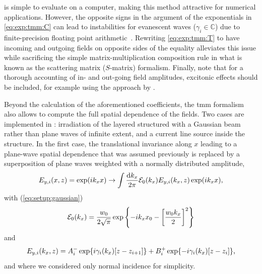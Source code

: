  is simple to evaluate on a computer, making this method attractive for numerical applications.
However, the opposite signs in the argument of the exponentials in \cref{eq:exp:tmm:C} can lead to instabilities for evanescent waves ($\gamma_i\in\mathbb{C}$) due to finite-precision floating point arithmetic~\cite{Duetz}.
Rewriting \cref{eq:exp:tmm:T} to have incoming and outgoing fields on opposite sides of the equality alleviates this issue while sacrificing the simple matrix-multiplication composition rule in what is known as the scattering matrix ($S$-matrix) formalism.
Finally, note that for a thorough accounting of in- and out-going field amplitudes, excitonic effects should be included, for example using the approach by \citet{DAndrea1990}.

Beyond the calculation of the aforementioned coefficients, the \gls{tmm} formalism also allows to compute the full spatial dependence of the fields.
Two cases are implemented in \pymoosh: irradiation of the layered structured with a Gaussian beam rather than plane waves of infinite extent, and a current line source inside the structure.
In the first case, the translational invariance along $x$ leading to a plane-wave spatial dependence
that was assumed previously is replaced by a superposition of plane waves weighted with a normally distributed amplitude,
\begin{equation}\label{eq:exp:tmm:gauss:x}
    E_{y,i}(x,z) = \exp(i k_x x)\rightarrow \int\frac{\dd{k_x}}{2\pi}\mathcal{E}_0(k_x) E_{y,i}(k_x, z)\exp(i k_x x),
\end{equation}
with (\cf \cref{eq:setup:gaussian})
\begin{equation}\label{eq:exp:tmm:gauss:ampl}
    \mathcal{E}_0(k_x) = \frac{w_0}{2\sqrt{\pi}}\exp\left\lbrace - i k_x x_0 -\left[\frac{w_0 k_x}{2}\right]^2\right\rbrace
\end{equation}
and
\begin{equation}\label{eq:exp:tmm:gauss:z}
    E_{y,i}(k_x, z) = A_{i}^{-}\exp\lbrace i\gamma_i(k_x)[z-z_{i+1}]\rbrace + B_{i}^{+}\exp\lbrace -i\gamma_i(k_x)[z-z_{i}]\rbrace,
\end{equation}
and where we considered only normal incidence for simplicity.

